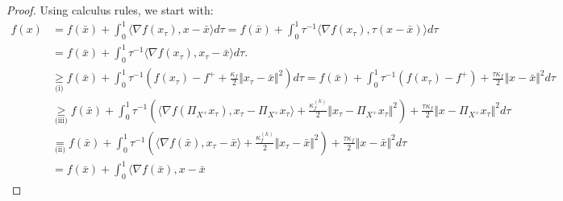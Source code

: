 \documentclass[12pt]{report}
\begin{document}
\begin{proof}
                Using calculus rules, we start with: 
                {\footnotesize
                \begin{align*}
                    f(x) &= 
                    f(\bar x) + \int_0^1 \langle \nabla f(x_\tau), x - \bar x\rangle d\tau
                    = 
                    f(\bar x) + \int_0^1 \tau^{-1}\langle \nabla f(x_\tau), \tau(x - \bar x)\rangle d\tau
                    \\
                    &= 
                    f(\bar x) + \int_0^1 \tau^{-1}\langle \nabla f(x_\tau), x_\tau - \bar x\rangle d\tau.
                    \\
                    &\underset{\text{(i)}}{\ge }
                    f(\bar x) + 
                    \int_0^1 \tau^{-1} \left(
                        f(x_\tau) - f^+ + \frac{\kappa_f}{2}\Vert x_\tau - \bar x\Vert^2
                    \right) d\tau
                    = 
                    f(\bar x) + 
                    \int_0^1 
                    \tau^{-1} \left(
                            f(x_\tau) - f^+ 
                        \right)
                        + \frac{\tau\kappa_f}{2}\Vert x - \bar x\Vert^2
                    d\tau
                    \\
                    &\underset{\text{(iii)}}{\ge }
                    f(\bar x) + 
                    \int_0^1 
                    \tau^{-1} \left(
                            \langle 
                                \nabla f(\Pi_{X^+}x_\tau), x_\tau - \Pi_{X^+}x_\tau
                            \rangle
                            + \frac{\kappa_f^{(k)}}{2} \Vert x_\tau - \Pi_{X^+}x_\tau\Vert^2
                        \right)
                        + \frac{\tau\kappa_f}{2}\Vert x - \Pi_{X^+}x_\tau\Vert^2
                    d\tau
                    \\
                    &\underset{\text{(ii)}}{=} 
                    f(\bar x) + 
                    \int_0^1 
                    \tau^{-1} \left(
                            \langle 
                                \nabla f(\bar x), x_\tau - \bar x
                            \rangle
                            + \frac{\kappa_f^{(k)}}{2} \Vert x_\tau - \bar x\Vert^2
                        \right)
                        + \frac{\tau\kappa_f}{2}\Vert x - \bar x\Vert^2
                    d\tau
                    \\
                    &= 
                    f(\bar x) + 
                    \int_0^1 
                        \langle 
                            \nabla f(\bar x), x - \bar x

\end{align*}}
\end{proof}
\end{document}
